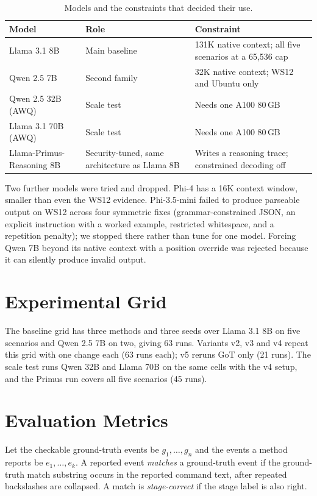 \begin{table}[H]
\centering
\caption{Models and the constraints that decided their use.}
\label{tab:models}
\small
\begin{tabularx}{\textwidth}{@{}>{\raggedright\arraybackslash}p{3.8cm} >{\raggedright\arraybackslash}p{3.8cm} Y@{}}
\toprule
\textbf{Model} & \textbf{Role} & \textbf{Constraint} \\
\midrule
Llama 3.1 8B~\cite{dubey2024llama3} & Main baseline & 131K native context; all five scenarios at a 65{,}536 cap \\
Qwen 2.5 7B~\cite{yang2024qwen25} & Second family & 32K native context; WS12 and Ubuntu only \\
Qwen 2.5 32B (AWQ) & Scale test & Needs one A100 80\,GB \\
Llama 3.1 70B (AWQ) & Scale test & Needs one A100 80\,GB \\
Llama-Primus-Reasoning 8B & Security-tuned, same architecture as Llama 8B & Writes a reasoning trace; constrained decoding off \\
\bottomrule
\end{tabularx}
\end{table}

Two further models were tried and dropped. Phi-4 has a 16K context window, smaller than even the WS12 evidence. Phi-3.5-mini failed to produce parseable output on WS12 across four symmetric fixes (grammar-constrained JSON, an explicit instruction with a worked example, restricted whitespace, and a repetition penalty); we stopped there rather than tune for one model. Forcing Qwen 7B beyond its native context with a position override was rejected because it can silently produce invalid output.

\section{Experimental Grid}
The baseline grid has three methods and three seeds over Llama 3.1 8B on five scenarios and Qwen 2.5 7B on two, giving 63 runs. Variants v2, v3 and v4 repeat this grid with one change each (63 runs each); v5 reruns GoT only (21 runs). The scale test runs Qwen 32B and Llama 70B on the same cells with the v4 setup, and the Primus run covers all five scenarios (45 runs).

\section{Evaluation Metrics}
\label{sec:metrics}
Let the checkable ground-truth events be $g_1,\dots,g_n$ and the events a method reports be $e_1,\dots,e_k$. A reported event \emph{matches} a ground-truth event if the ground-truth match substring occurs in the reported command text, after repeated backslashes are collapsed. A match is \emph{stage-correct} if the stage label is also right.

